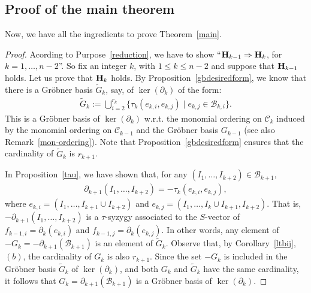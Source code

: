 \documentclass[10pt]{amsart}
\newcommand{\mcb}{\mbox{$\mathcal{B}$}}
\newcommand{\mcc}{\mbox{$\mathcal{C}$}}
\newcommand{\mbfh}{\mbox{${\bf H}$}}
\newcommand{\dif}{\mbox{$\partial$}}
\theoremstyle{definition}
\theoremstyle{remark}
\begin{document}
\subsection{Proof of the main theorem}

 Now, we have all the ingredients to prove
Theorem~\ref{main}.
\begin{proof} Acording to Purpose~\ref{reduction},
we have to show ``$\mbfh_{k-1}\Rightarrow \mbfh_{k}$, for $k=1,\ldots
,n-2$''. So fix an integer $k$, with $1\leq k\leq n-2$ and suppose
that $\mbfh_{k-1}$ holds. Let us prove that $\mbfh_k$ holds. By
Proposition~\ref{gbdesiredform}, we know that there is a Gr\"obner
basis $\tilde{G}_k$, say, of $\ker(\dif_{k})$ of the form: 
\begin{eqnarray}\label{groebf}
\tilde{G}_k:=\bigcup_{i=2}^{r_{k}}\{ \tau_{k}(e_{k,i},e_{k,j})\mid
e_{k,j}\in\mcb_{k,i}\}.
\end{eqnarray}
This is a Gr\"obner basis of $\ker(\dif_{k})$ w.r.t. the monomial
ordering on $\mcc_k$ induced by the monomial ordering on $\mcc_{k-1}$
and the Gr\"obner basis $G_{k-1}$ (see also
Remark~\ref{mon-ordering}). Note that Proposition~\ref{gbdesiredform}
ensures that the cardinality of $\tilde{G}_k$ is $r_{k+1}$.

In Proposition~\ref{tau}, we have shown that, for any $(I_1,\ldots
,I_{k+2})\in\mcb_{k+1}$,
\begin{eqnarray*}
\dif_{k+1}(I_1,\ldots,I_{k+2})=-\tau_{k}(e_{k,i},e_{k,j}),
\end{eqnarray*}
where $e_{k,i}=(I_1,\ldots ,I_{k+1}\cup I_{k+2})$ and
$e_{k,j}=(I_1,\ldots,I_{k}\cup I_{k+1},I_{k+2})$. That is,
$-\dif_{k+1}(I_1,\ldots,I_{k+2})$ is a $\tau$-syzygy associated to the
$S$-vector of $f_{k-1,i}=\dif_{k}(e_{k,i})$ and
$f_{k-1,j}=\dif_{k}(e_{k,j})$. In other words, any element of
$-G_{k}=-\dif_{k+1}(\mcb_{k+1})$ is an element of
$\tilde{G}_k$. Observe that, by Corollary~\ref{ltbij}, $(b)$, the
cardinality of $G_k$ is also $r_{k+1}$. Since the set $-G_{k}$ is
included in the Gr\"obner basis $\tilde{G}_k$ of $\ker(\dif_k)$, and
both $G_k$ and $\tilde{G}_k$ have the same cardinality, it follows
that $G_k=\dif_{k+1}(\mcb_{k+1})$ is a Gr\"obner basis of
$\ker(\dif_{k})$.


\end{proof}
\end{document}

